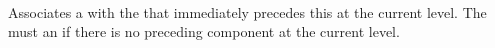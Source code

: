  \\

Associates a  with the  that immediately precedes this  at the current level. The  must  an  if there is no preceding component at the current level. \\

